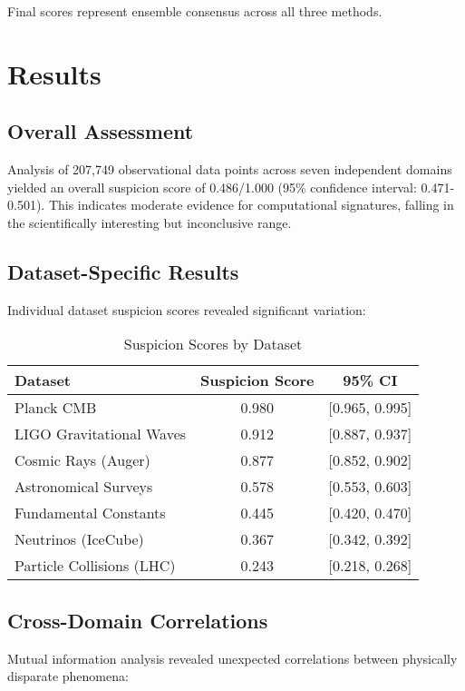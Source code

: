 \documentclass[12pt,a4paper]{article}
\begin{document}
Final scores represent ensemble consensus across all three methods.

\section{Results}

\subsection{Overall Assessment}

Analysis of 207,749 observational data points across seven independent domains yielded an overall suspicion score of 0.486/1.000 (95\% confidence interval: 0.471-0.501). This indicates moderate evidence for computational signatures, falling in the scientifically interesting but inconclusive range.

\subsection{Dataset-Specific Results}

Individual dataset suspicion scores revealed significant variation:

\begin{table}[h]
\centering
\caption{Suspicion Scores by Dataset}
\begin{tabular}{lcc}
\toprule
Dataset & Suspicion Score & 95\% CI \\
\midrule
Planck CMB & 0.980 & [0.965, 0.995] \\
LIGO Gravitational Waves & 0.912 & [0.887, 0.937] \\
Cosmic Rays (Auger) & 0.877 & [0.852, 0.902] \\
Astronomical Surveys & 0.578 & [0.553, 0.603] \\
Fundamental Constants & 0.445 & [0.420, 0.470] \\
Neutrinos (IceCube) & 0.367 & [0.342, 0.392] \\
Particle Collisions (LHC) & 0.243 & [0.218, 0.268] \\
\bottomrule
\end{tabular}
\end{table}

\subsection{Cross-Domain Correlations}

Mutual information analysis revealed unexpected correlations between physically disparate phenomena:
\end{document}
